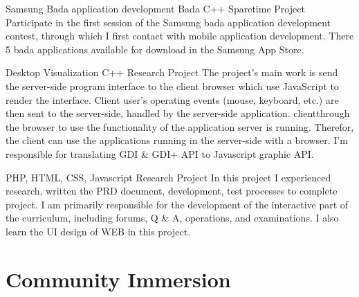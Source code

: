 \documentclass[11pt,a4paper]{moderncv}
\begin{document}
\vspace*{0.2\baselineskip}
{Samsung Bada application development}
{Bada C++}
{Sparetime Project}{}
{Participate in the first session of the Samsung bada application development contest, through which I first contact with mobile
application development. There 5 bada applications available for download in the Samsung App Store.
}

\vspace*{0.2\baselineskip}
{Desktop Visualization}
{C++}
{Research Project}{}
{The project's main work is send the server-side program interface to the client browser which use JavaScript to render the interface. 
Client user's operating events (mouse, keyboard, etc.) are then sent to the server-side, handled by the server-side application.
clientthrough the browser to use the functionality of the application server is running. Therefor, the client can use the
applications running in the server-side with a browser. I'm responsible for translating GDI & GDI+ API to Javascript graphic API.
}

\vspace*{0.2\baselineskip}
{}
{PHP, HTML, CSS, Javascript}
{Research Project}{}
{
In this project I experienced research, written the PRD document, development, test processes to complete project. 
I am primarily responsible for the development of the interactive part of the curriculum, including forums, Q & A,
operations, and examinations. I also learn the UI design of WEB in this project.
}







\section{Community Immersion}
\end{document}
